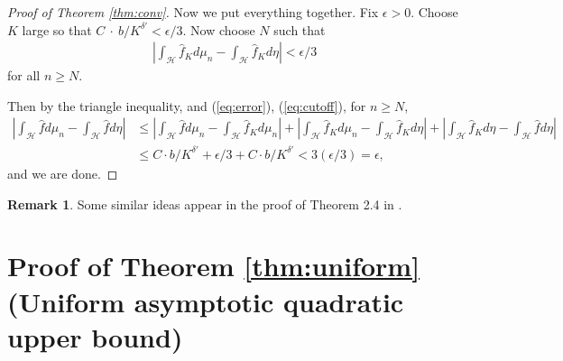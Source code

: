 \documentclass{article}
\theoremstyle{definition}
\newtheorem{rmk}{Remark}[section]
\begin{document}
\begin{proof}[Proof of Theorem \ref{thm:conv}]
Now we put everything together.  Fix $\epsilon>0$. Choose $K$ large so that $C~\cdot~ b/K^{\delta'} < \epsilon/3$. Now choose $N$ such that 
\begin{align}
  \label{eq:cutoff}
  \left|\int_{\mathcal{H}} \hat f_K d\mu_n - \int_{\mathcal{H}} \hat f_K d\eta\right| <\epsilon/3
\end{align}
for all $n\ge N$.  

Then by the triangle inequality, and (\ref{eq:error}), (\ref{eq:cutoff}), for $n\ge N$,
\begin{align*}
\left| \int_{\mathcal{H}} \hat f d\mu_n -  \int_{\mathcal{H}} \hat f d\eta \right| &\le \left| \int_{\mathcal{H}} \hat f d\mu_n -  \int_{\mathcal{H}} \hat f_K d\mu_n \right| + \left| \int_{\mathcal{H}} \hat f_K d\mu_n -  \int_{\mathcal{H}} \hat f_K d\eta \right| + \left| \int_{\mathcal{H}} \hat f_K d\eta -  \int_{\mathcal{H}} \hat f d\eta \right| \\
&\le C\cdot b /K^{\delta'} +\epsilon/3 + C\cdot b /K^{\delta'} < 3(\epsilon/3) = \epsilon,
\end{align*}
and we are done.  
\end{proof}

\begin{rmk}
  Some similar ideas appear in the proof of Theorem 2.4 in \cite{ems2003}. 
\end{rmk}

\section{Proof of Theorem \ref{thm:uniform} (Uniform asymptotic quadratic upper bound)}
\label{sec:uniform}
\end{document}
